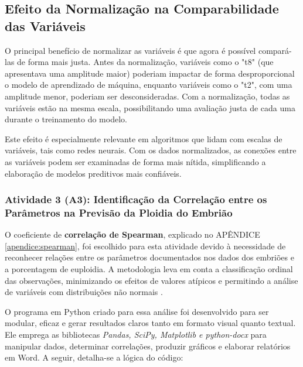 \subsection*{Efeito da Normalização na Comparabilidade das Variáveis}
O principal benefício de normalizar as variáveis é que agora é possível compará-las de forma mais justa. Antes da normalização, variáveis como o "t8" (que apresentava uma amplitude maior) poderiam impactar de forma desproporcional o modelo de aprendizado de máquina, enquanto variáveis como o "t2", com uma amplitude menor, poderiam ser desconsideradas. Com a normalização, todas as variáveis estão na mesma escala, possibilitando uma avaliação justa de cada uma durante o treinamento do modelo.

Este efeito é especialmente relevante em algoritmos que lidam com escalas de variáveis, tais como redes neurais. Com os dados normalizados, as conexões entre as variáveis podem ser examinadas de forma mais nítida, simplificando a elaboração de modelos preditivos mais confiáveis.

\subsubsection{Atividade 3 (A3): Identificação da Correlação entre os Parâmetros na Previsão da Ploidia do Embrião}

O coeficiente de \textbf{correlação de Spearman}, explicado no APÊNDICE \ref{apendice:spearman}, foi escolhido para esta atividade devido à necessidade de reconhecer relações entre os parâmetros documentados nos dados dos embriões e a porcentagem de euploidia. A metodologia leva em conta a classificação ordinal das observações, minimizando os efeitos de valores atípicos e permitindo a análise de variáveis com distribuições não normais \cite{sousa2019}.

O programa em Python criado para essa análise foi desenvolvido para ser modular, eficaz e gerar resultados claros tanto em formato visual quanto textual. Ele emprega as bibliotecas \textit{Pandas, SciPy, Matplotlib e python-docx} para manipular dados, determinar correlações, produzir gráficos e elaborar relatórios em Word. A seguir, detalha-se a lógica do código:

